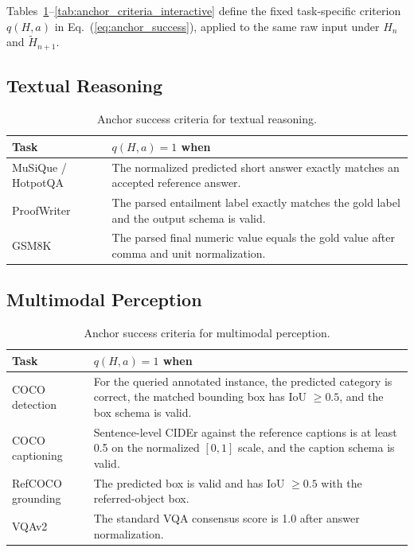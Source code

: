 \documentclass{article}
\begin{document}
Tables~\ref{tab:anchor_criteria_text}--\ref{tab:anchor_criteria_interactive}
define the fixed task-specific criterion $q(H,a)$ in
Eq.~(\ref{eq:anchor_success}), applied to the same raw input under $H_n$ and
$\widetilde{H}_{n+1}$.

\subsection{Textual Reasoning}

\begin{table}[H]
\centering
\small
\caption{Anchor success criteria for textual reasoning.}
\label{tab:anchor_criteria_text}
\begin{tabular}{p{}p{}}
\toprule
Task & $q(H,a)=1$ when \\
\midrule
MuSiQue / HotpotQA
& The normalized predicted short answer exactly matches an accepted reference
answer. \\

ProofWriter
& The parsed entailment label exactly matches the gold label and the output
schema is valid. \\

GSM8K
& The parsed final numeric value equals the gold value after comma and unit
normalization. \\
\bottomrule
\end{tabular}
\end{table}

\subsection{Multimodal Perception}

\begin{table}[H]
\centering
\small
\caption{Anchor success criteria for multimodal perception.}
\label{tab:anchor_criteria_multimodal}
\begin{tabular}{p{}p{}}
\toprule
Task & $q(H,a)=1$ when \\
\midrule
COCO detection
& For the queried annotated instance, the predicted category is correct, the
matched bounding box has IoU $\geq 0.5$, and the box schema is valid. \\

COCO captioning
& Sentence-level CIDEr against the reference captions is at least 0.5 on the
normalized $[0,1]$ scale, and the caption schema is valid. \\

RefCOCO grounding
& The predicted box is valid and has IoU $\geq 0.5$ with the referred-object
box. \\

VQAv2
& The standard VQA consensus score is 1.0 after answer normalization. \\
\bottomrule
\end{tabular}
\end{table}
\end{document}
